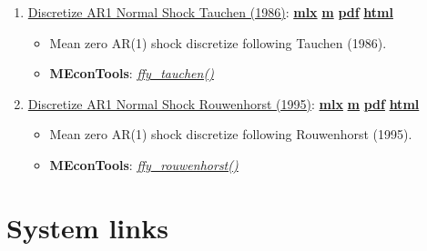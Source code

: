 \documentclass[
]{book}
\providecommand{\tightlist}{%
  \setlength{\itemsep}{0pt}\setlength{\parskip}{0pt}}
\begin{document}
\begin{enumerate}
\def\labelenumi{\arabic{enumi}.}
\tightlist
\item
  \href{https://fanwangecon.github.io/MEconTools/MEconTools/doc/external/htmlpdfm/fxy_tauchen.html}{Discretize AR1 Normal Shock Tauchen (1986)}: \href{https://github.com/FanWangEcon/MEconTools/blob/master/MEconTools/doc/external/fxy_tauchen.mlx}{\textbf{mlx}} \textbar{} \href{https://github.com/FanWangEcon/MEconTools/blob/master/MEconTools/doc/external/htmlpdfm/fxy_tauchen.m}{\textbf{m}} \textbar{} \href{https://github.com/FanWangEcon/MEconTools/blob/master/MEconTools/doc/external/htmlpdfm/fxy_tauchen.pdf}{\textbf{pdf}} \textbar{} \href{https://fanwangecon.github.io/MEconTools/MEconTools/doc/external/htmlpdfm/fxy_tauchen.html}{\textbf{html}}

  \begin{itemize}
  \tightlist
  \item
    Mean zero AR(1) shock discretize following Tauchen (1986).
  \item
    \textbf{MEconTools}: \emph{\href{https://github.com/FanWangEcon/MEconTools/blob/master/MEconTools/external/stats/ffy_tauchen.m}{ffy\_tauchen()}}
  \end{itemize}
\item
  \href{https://fanwangecon.github.io/MEconTools/MEconTools/doc/external/htmlpdfm/fxy_rouwenhorst.html}{Discretize AR1 Normal Shock Rouwenhorst (1995)}: \href{https://github.com/FanWangEcon/MEconTools/blob/master/MEconTools/doc/external/fxy_rouwenhorst.mlx}{\textbf{mlx}} \textbar{} \href{https://github.com/FanWangEcon/MEconTools/blob/master/MEconTools/doc/external/htmlpdfm/fxy_rouwenhorst.m}{\textbf{m}} \textbar{} \href{https://github.com/FanWangEcon/MEconTools/blob/master/MEconTools/doc/external/htmlpdfm/fxy_rouwenhorst.pdf}{\textbf{pdf}} \textbar{} \href{https://fanwangecon.github.io/MEconTools/MEconTools/doc/external/htmlpdfm/fxy_rouwenhorst.html}{\textbf{html}}

  \begin{itemize}
  \tightlist
  \item
    Mean zero AR(1) shock discretize following Rouwenhorst (1995).
  \item
    \textbf{MEconTools}: \emph{\href{https://github.com/FanWangEcon/MEconTools/blob/master/MEconTools/external/stats/ffy_rouwenhorst.m}{ffy\_rouwenhorst()}}
  \end{itemize}
\end{enumerate}

\hypertarget{system-links}{%
\section{System links}\label{system-links}}
\end{document}
